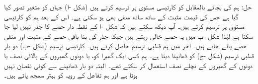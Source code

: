 حل:\quad
ہم  کی بجائے  بالمقابل  کو کارتیسی  مستوی پر ترسیم کرتے ہیں (شکل -ا) جہاں  کو متغیر تصور کیا گیا ہے جس کی قیمت مثبت کے ساتھ ساتھ منفی بھی ہو سکتی ہے۔ اس کے بعد ہم  کو کارتیسی  مستوی پر ترسیم کرتے ہیں۔ آپ دیکھ سکتے ہیں کہ شکل -ا کے نقطہ دار حصے کا جذر نہیں لیا جا سکتا ہے لہٰذا شکل -ب میں یہ حصے خالی رہتے ہیں جبکہ جذر کی بنا باقی حصے کے مثبت اور منفی حصے پائے جاتے ہیں۔  آخر میں ہم قطبی ترسیم حاصل کرتے ہیں۔ کارتیسی ترسیم (شکل -ب) دو بار قطبی ترسیم (شکل -ج) کو ڈھانپتا  دیتا ہے۔ ہم کسی ایک گھیرا کو، یا دونوں گھیروں کے بالائی نصف یا دونوں کے گھیروں کے نچلے نصف  استعمال کر سکتے تھے۔ البتہ دو بار ڈھانپنے سے کوئی نقصان نہیں ہوتا ہے اور ہم تفاعل کے رویہ کو بہتر سمجھ پاتے ہیں۔
